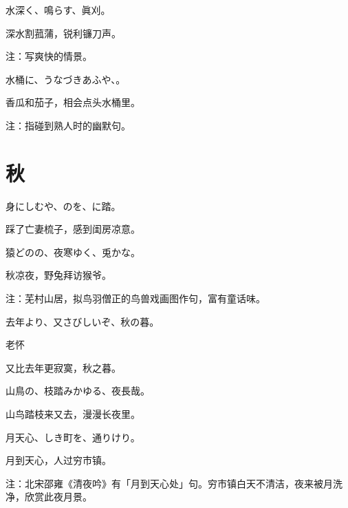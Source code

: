 \begin{haiku}
    {\FH 水深く、鳴らす、眞刈。}

    {\FK 深水割菰蒲，锐利镰刀声。}

    {\FT 注：写爽快的情景。}
\end{haiku}

\begin{haiku}
    {\FH 水桶に、うなづきあふや、。}

    {\FK 香瓜和茄子，相会点头水桶里。}

    {\FT 注：指碰到熟人时的幽默句。}
\end{haiku}

\section{\FK 秋}

\setcounter{haikucounter}{0}

\begin{haiku}
    {\FH 身にしむや、のを、に踏。}

    {\FK 踩了亡妻梳子，感到闺房凉意。}
\end{haiku}

\begin{haiku}
    {\FH 猿どのの、夜寒ゆく、兎かな。}

    {\FK 秋凉夜，野兔拜访猴爷。}

    {\FT 注：芜村山居，拟鸟羽僧正的鸟兽戏画图作句，富有童话味。}
\end{haiku}

\begin{haiku}
    {\FH 去年より、又さびしいぞ、秋の暮。}

    {\FK 老怀}

    {\FK 又比去年更寂寞，秋之暮。}
\end{haiku}

\begin{haiku}
    {\FH 山鳥の、枝踏みかゆる、夜長哉。}

    {\FK 山鸟踏枝来又去，漫漫长夜里。}
\end{haiku}

\begin{haiku}
    {\FH 月天心、しき町を、通りけり。}

    {\FK 月到天心，人过穷市镇。}

    {\FT 注：北宋邵雍《清夜吟》有「月到天心处」句。穷市镇白天不清洁，夜来被月洗净，欣赏此夜月景。}
\end{haiku}

